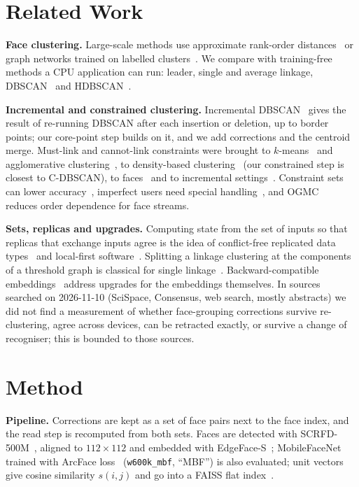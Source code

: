 \documentclass[conference]{IEEEtran}
\begin{document}
\section{Related Work}
\textbf{Face clustering.} Large-scale methods use approximate rank-order distances~\cite{otto2018clustering} or graph
networks trained on labelled clusters~\cite{wang2019linkage,yang2019affinity}. We compare with training-free methods a CPU
application can run: leader, single and average linkage, DBSCAN~\cite{ester1996dbscan} and HDBSCAN~\cite{campello2013hdbscan}.

\textbf{Incremental and constrained clustering.} Incremental DBSCAN~\cite{ester1998incremental} gives the result of
re-running DBSCAN after each insertion or deletion, up to border points; our core-point step builds on it, and we add corrections
and the centroid merge. Must-link and cannot-link constraints were brought to $k$-means~\cite{wagstaff2001copkmeans} and
agglomerative clustering~\cite{davidson2005agglomerative}, to density-based clustering~\cite{ruiz2007cdbscan} (our constrained
step is closest to C-DBSCAN), to faces~\cite{shi2018conpac} and to incremental
settings~\cite{davidson2007incremental,monath2019grinch}. Constraint sets can lower accuracy~\cite{davidson2006utility}, imperfect
users need special handling~\cite{zhu2016imperfect}, and OGMC~\cite{montero2022ogmc} reduces order dependence
for face streams.

\textbf{Sets, replicas and upgrades.} Computing state from the set of inputs so that replicas that exchange inputs agree is
the idea of conflict-free replicated data types~\cite{shapiro2011crdt} and local-first software~\cite{kleppmann2019local}.
Splitting a linkage clustering at the components of a threshold graph is classical for single
linkage~\cite{gower1969mst}. Backward-compatible embeddings~\cite{shen2020backward} address upgrades for the
embeddings themselves. In sources searched on 2026-11-10 (SciSpace, Consensus, web search, mostly abstracts) we did not find a
measurement of whether face-grouping corrections survive re-clustering, agree across devices, can be retracted exactly, or
survive a change of recogniser; this is bounded to those sources.

\section{Method}\label{sec:method}
\textbf{Pipeline.} Corrections are kept as a set of face pairs next to the face index, and the read step is recomputed from both sets. Faces are detected with SCRFD-500M~\cite{guo2022scrfd}, aligned to $112\times112$
and embedded with EdgeFace-S~\cite{george2024edgeface}; MobileFaceNet~\cite{chen2018mobilefacenets} trained with ArcFace loss~\cite{deng2019arcface} (\texttt{w600k\_mbf}, ``MBF'') is also evaluated; unit vectors give
cosine similarity $s(i,j)$ and go into a FAISS flat index~\cite{johnson2021faiss}.
\end{document}
